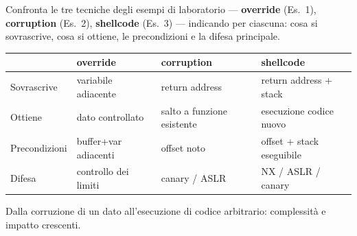 \question[6]
Confronta le tre tecniche degli esempi di laboratorio --- \textbf{override} (Es.\ 1), \textbf{corruption} (Es.\ 2), \textbf{shellcode} (Es.\ 3) --- indicando per ciascuna: cosa si sovrascrive, cosa si ottiene, le precondizioni e la difesa principale.
\begin{solution}
\begin{center}\small
\begin{tabular}{@{}llll@{}}
\toprule
 & \textbf{override} & \textbf{corruption} & \textbf{shellcode}\\
\midrule
Sovrascrive & variabile adiacente & return address & return address + stack\\
Ottiene & dato controllato & salto a funzione esistente & esecuzione codice nuovo\\
Precondizioni & buffer+var adiacenti & offset noto & offset + stack eseguibile\\
Difesa & controllo dei limiti & canary / ASLR & NX / ASLR / canary\\
\bottomrule
\end{tabular}
\end{center}
Dalla corruzione di un dato all'esecuzione di codice arbitrario: complessità e impatto crescenti.
\end{solution}
